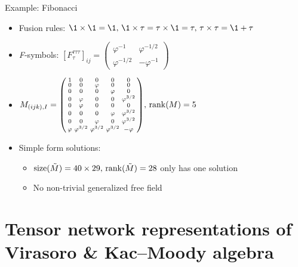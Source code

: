 \documentclass{fdubeamer}
\begin{document}
\begin{frame}{Example: Fibonacci}

\begin{itemize}
  \item Fusion rules: $
      \1 \times \1 = \1, \,
      \1 \times \tau = \tau \times \1 = \tau, \,
      \tau \times \tau = \1 + \tau
    $
  \item \textit{F}-symbols: $
      [F^{\tau\tau\tau}_\tau]_{ij} = \left( \begin{smallmatrix}
        \varphi^{-1}   &  \varphi^{-1/2} \\
        \varphi^{-1/2} & -\varphi^{-1}
      \end{smallmatrix} \right)
    $ \\[1ex]
  \item $
      M_{(ijk), I} = \left( \begin{smallmatrix}
        1 & 0 & 0 & 0 & 0 \\
        0 & 0 & \varphi & 0 & 0 \\
        0 & 0 & 0 & \varphi & 0 \\
        0 & \varphi & 0 & 0 & \varphi^{3/2} \\
        0 & \varphi & 0 & 0 & 0 \\
        0 & 0 & 0 & \varphi & \varphi^{3/2} \\
        0 & 0 & \varphi & 0 & \varphi^{3/2} \\
        \varphi & \varphi^{3/2} & \varphi^{3/2} & \varphi^{3/2} & -\varphi
      \end{smallmatrix} \right)\!, \,
      \operatorname{rank}(M) = 5
    $ \\[1ex]

  \item Simple form solutions:

    \begin{itemize}
      \item $\operatorname{size}(\tilde{M})=40\times29, \, \operatorname{rank}(\tilde{M})=28$
        \textrightarrow{} only has one solution
      \item No non-trivial generalized free field
    \end{itemize}
\end{itemize}

\end{frame}

\section{Tensor network representations of \\ Virasoro \& Kac--Moody algebra}
\end{document}
